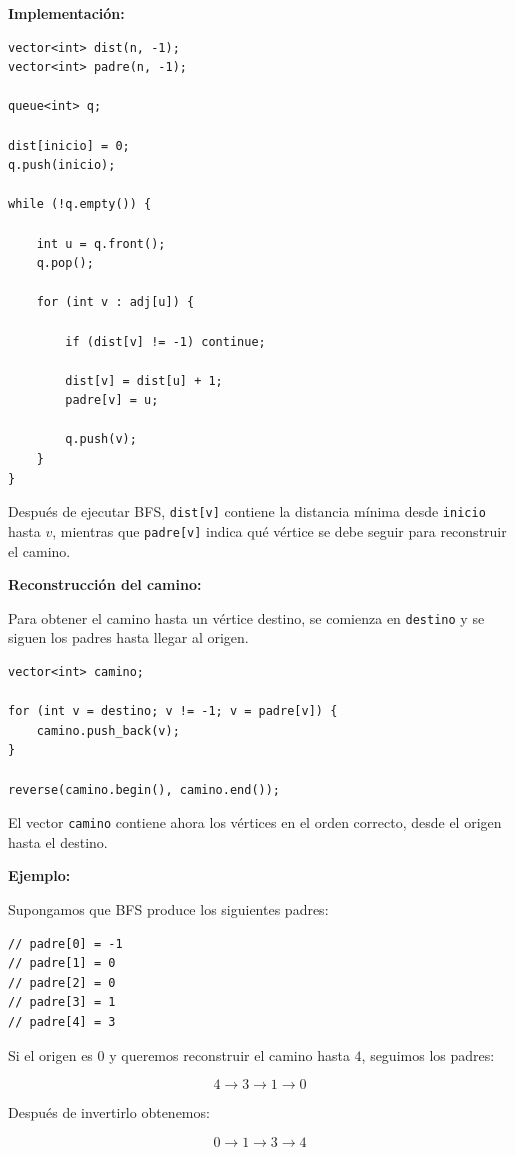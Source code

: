 \documentclass[10pt,a4paper,twocolumn]{article}
\begin{document}
\textbf{Implementación:}

\begin{lstlisting}[style=cpp]
vector<int> dist(n, -1);
vector<int> padre(n, -1);

queue<int> q;

dist[inicio] = 0;
q.push(inicio);

while (!q.empty()) {

    int u = q.front();
    q.pop();

    for (int v : adj[u]) {

        if (dist[v] != -1) continue;

        dist[v] = dist[u] + 1;
        padre[v] = u;

        q.push(v);
    }
}
\end{lstlisting}

Después de ejecutar BFS, \texttt{dist[v]} contiene la distancia mínima
desde \texttt{inicio} hasta $v$, mientras que \texttt{padre[v]} indica
qué vértice se debe seguir para reconstruir el camino.

\textbf{Reconstrucción del camino:}

Para obtener el camino hasta un vértice destino, se comienza en
\texttt{destino} y se siguen los padres hasta llegar al origen.

\begin{lstlisting}[style=cpp]
vector<int> camino;

for (int v = destino; v != -1; v = padre[v]) {
    camino.push_back(v);
}

reverse(camino.begin(), camino.end());
\end{lstlisting}

El vector \texttt{camino} contiene ahora los vértices en el orden
correcto, desde el origen hasta el destino.

\textbf{Ejemplo:}

Supongamos que BFS produce los siguientes padres:

\begin{lstlisting}[style=cpp]
// padre[0] = -1
// padre[1] = 0
// padre[2] = 0
// padre[3] = 1
// padre[4] = 3
\end{lstlisting}

Si el origen es $0$ y queremos reconstruir el camino hasta $4$,
seguimos los padres:

\[
4 \rightarrow 3 \rightarrow 1 \rightarrow 0
\]

Después de invertirlo obtenemos:

\[
0 \rightarrow 1 \rightarrow 3 \rightarrow 4
\]
\end{document}
